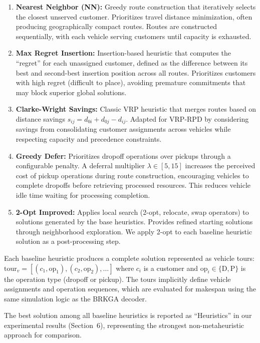\documentclass{article}
\begin{document}
\begin{enumerate}
\item \textbf{Nearest Neighbor (NN):} Greedy route construction that iteratively selects the closest unserved customer. Prioritizes travel distance minimization, often producing geographically compact routes. Routes are constructed sequentially, with each vehicle serving customers until capacity is exhausted.

\item \textbf{Max Regret Insertion:} Insertion-based heuristic that computes the ``regret'' for each unassigned customer, defined as the difference between its best and second-best insertion position across all routes. Prioritizes customers with high regret (difficult to place), avoiding premature commitments that may block superior global solutions.

\item \textbf{Clarke-Wright Savings:} Classic VRP heuristic that merges routes based on distance savings $s_{ij} = d_{0i} + d_{0j} - d_{ij}$. Adapted for VRP-RPD by considering savings from consolidating customer assignments across vehicles while respecting capacity and precedence constraints.

\item \textbf{Greedy Defer:} Prioritizes dropoff operations over pickups through a configurable penalty. A deferral multiplier $\lambda \in [5, 15]$ increases the perceived cost of pickup operations during route construction, encouraging vehicles to complete dropoffs before retrieving processed resources. This reduces vehicle idle time waiting for processing completion.

\item \textbf{2-Opt Improved:} Applies local search (2-opt, relocate, swap operators) to solutions generated by the base heuristics. Provides refined starting solutions through neighborhood exploration. We apply 2-opt to each baseline heuristic solution as a post-processing step.
\end{enumerate}

Each baseline heuristic produces a complete solution represented as vehicle tours: $\text{tour}_v = [(c_1, \text{op}_1), (c_2, \text{op}_2), \ldots]$ where $c_i$ is a customer and $\text{op}_i \in \{\text{D}, \text{P}\}$ is the operation type (dropoff or pickup). The tours implicitly define vehicle assignments and operation sequences, which are evaluated for makespan using the same simulation logic as the BRKGA decoder.

The best solution among all baseline heuristics is reported as ``Heuristics'' in our experimental results (Section~6), representing the strongest non-metaheuristic approach for comparison.
\end{document}
